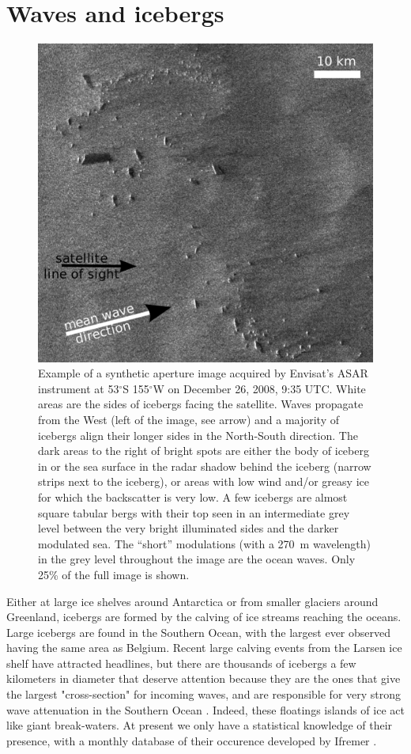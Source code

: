 \section{Waves and icebergs}
\begin{figure}%
\begin{center}
 \includegraphics[width=0.7\columnwidth]{FIGS_CH_ICE/SAR_icebergs.pdf}
 \caption{Example of a synthetic aperture image acquired by Envisat's ASAR instrument at 
53$^\circ$S 155$^\circ$W on December 26, 2008, 9:35 UTC. White areas are the sides of icebergs facing the satellite.
Waves propagate from the West (left of the image, see arrow) and a majority of icebergs align their 
longer sides in the North-South direction. The dark areas to the right of bright spots are either the body of iceberg in or the sea surface in the radar shadow 
behind the iceberg (narrow strips next to the iceberg), or areas with low wind and/or greasy ice for which the backscatter is very low. 
A few icebergs are almost square tabular bergs with their top seen in an intermediate grey level between the very bright illuminated sides and the darker modulated
sea. The ``short'' modulations (with a 270~m wavelength) in the grey level throughout the image are the ocean waves. Only 25\% of the 
full image is shown.\label{fig:SAR_icebergs}}
 \end{center}
\end{figure}
Either at large ice shelves around Antarctica or from smaller glaciers around Greenland, icebergs are formed by the calving of ice streams reaching the oceans. Large icebergs are found in the Southern Ocean, with the largest ever observed having the same area as Belgium. Recent large calving events from the Larsen ice shelf have attracted headlines, but there are thousands of icebergs a few kilometers in diameter \citep{Tournadre&al.2016} that deserve attention because they are the ones that give the largest "cross-section" for incoming waves, and are responsible for very strong wave attenuation in the Southern Ocean \citep{Ardhuin&al.2011b}. Indeed, these floatings islands of ice act like giant break-waters. At present we only have a statistical knowledge of their presence, with a monthly database of their occurence developed by Ifremer \citep{Tournadre&al.2016}. 


